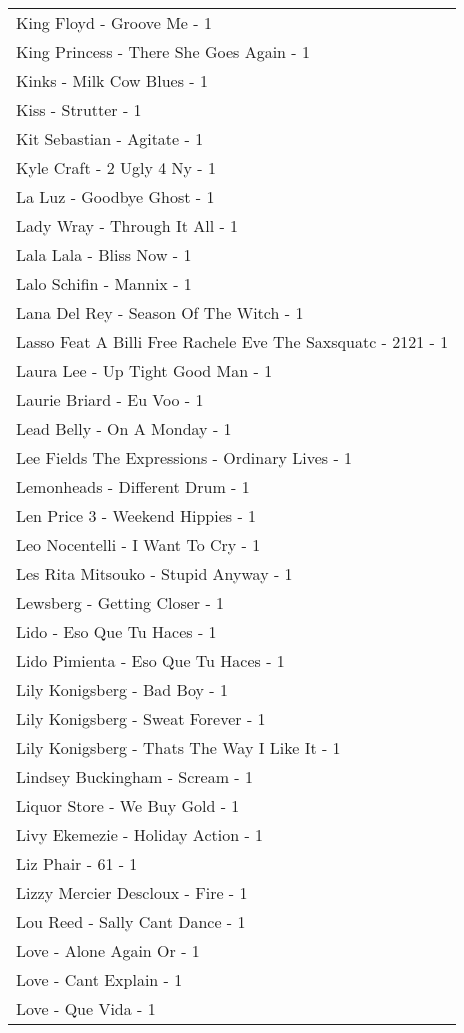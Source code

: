 \documentclass[
]{article}
\begin{document}
\begin{longtable}{l}
King Floyd - Groove Me - 1 \\ 
King Princess - There She Goes Again - 1 \\ 
Kinks - Milk Cow Blues - 1 \\ 
Kiss - Strutter - 1 \\ 
Kit Sebastian - Agitate - 1 \\ 
Kyle Craft - 2 Ugly 4 Ny - 1 \\ 
La Luz - Goodbye Ghost - 1 \\ 
Lady Wray - Through It All - 1 \\ 
Lala Lala - Bliss Now - 1 \\ 
Lalo Schifin - Mannix - 1 \\ 
Lana Del Rey - Season Of The Witch - 1 \\ 
Lasso Feat A Billi Free Rachele Eve The Saxsquatc - 2121 - 1 \\ 
Laura Lee - Up Tight Good Man - 1 \\ 
Laurie Briard - Eu Voo - 1 \\ 
Lead Belly - On A Monday - 1 \\ 
Lee Fields The Expressions - Ordinary Lives - 1 \\ 
Lemonheads - Different Drum - 1 \\ 
Len Price 3 - Weekend Hippies - 1 \\ 
Leo Nocentelli - I Want To Cry - 1 \\ 
Les Rita Mitsouko - Stupid Anyway - 1 \\ 
Lewsberg - Getting Closer - 1 \\ 
Lido - Eso Que Tu Haces - 1 \\ 
Lido Pimienta - Eso Que Tu Haces - 1 \\ 
Lily Konigsberg - Bad Boy - 1 \\ 
Lily Konigsberg - Sweat Forever - 1 \\ 
Lily Konigsberg - Thats The Way I Like It - 1 \\ 
Lindsey Buckingham - Scream - 1 \\ 
Liquor Store - We Buy Gold - 1 \\ 
Livy Ekemezie - Holiday Action - 1 \\ 
Liz Phair - 61 - 1 \\ 
Lizzy Mercier Descloux - Fire - 1 \\ 
Lou Reed - Sally Cant Dance - 1 \\ 
Love - Alone Again Or - 1 \\ 
Love - Cant Explain - 1 \\ 
Love - Que Vida - 1 \\ 

\end{longtable}
\end{document}
